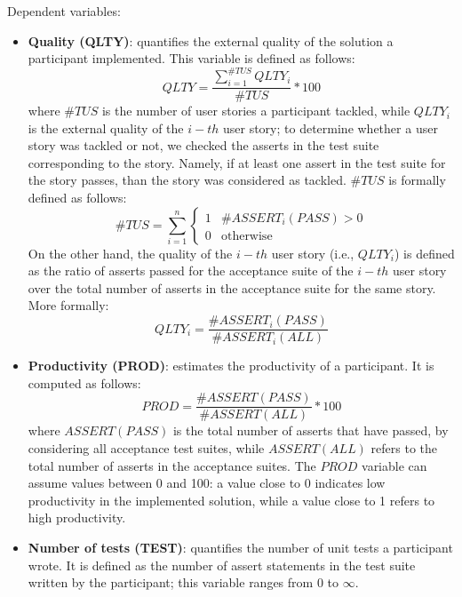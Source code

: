Dependent variables:
\begin{itemize}
    \item \textbf{Quality (QLTY)}: quantifies the external quality of the solution a participant implemented. This variable is defined as follows: 
        \[
            QLTY = \frac{\sum_{i=1}^{\#TUS} QLTY_i}{\#TUS} * 100 
        \]
    where $\#TUS$ is the number of user stories a participant tackled, while $QLTY_i$ is the external quality of the $i-th$ user story; to determine whether a user story was tackled or not, we checked the asserts in the test suite corresponding to the story. Namely, if at least one assert in the test suite for the story passes, than the story was considered as tackled. $\#TUS$ is formally defined as follows:
        \[
            \#TUS = \sum_{i=1}^{n} 
                \begin{cases}
                    1 & \text{$\#ASSERT_i(PASS) > 0$}\\
                    0 & \text{otherwise}
                \end{cases}
        \]
    On the other hand, the quality of the $i-th$ user story (i.e., $QLTY_i$) is defined as the ratio of asserts passed for the acceptance suite of the $i-th$ user story over the total number of asserts in the acceptance suite for the same story. More formally:
        \[
            QLTY_i = \frac{\#ASSERT_i(PASS)}{\#ASSERT_i(ALL)}
        \]
    \item \textbf{Productivity (PROD)}: estimates the productivity of a participant. It is computed as follows:
        \[
            PROD = \frac{\#ASSERT(PASS)}{\#ASSERT(ALL)} * 100
        \]
    where $ASSERT(PASS)$ is the total number of asserts that have passed, by considering all acceptance test suites, while $ASSERT(ALL)$ refers to the total number of asserts in the acceptance suites. The $PROD$ variable can assume values between 0 and 100: a value close to 0 indicates low productivity in the implemented solution, while a value close to 1 refers to high productivity.
    \item \textbf{Number of tests (TEST)}: quantifies the number of unit tests a participant wrote. It is defined as the number of assert statements in the test suite written by the participant; this variable ranges from 0 to $\infty$.
\end{itemize}


